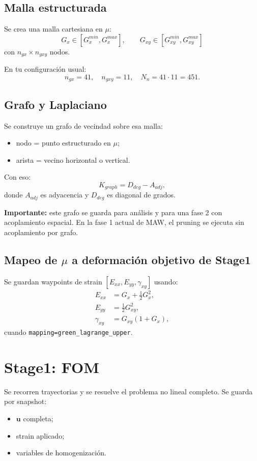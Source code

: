 \documentclass[11pt,a4paper]{article}
\begin{document}
\subsection{Malla estructurada}
Se crea una malla cartesiana en $\mu$:
\[
G_x \in [G_x^{min}, G_x^{max}],\qquad
G_{xy} \in [G_{xy}^{min}, G_{xy}^{max}]
\]
con $n_{gx}\times n_{gxy}$ nodos.

En tu configuración usual:
\[
n_{gx}=41,\quad n_{gxy}=11,\quad N_n=41\cdot 11=451.
\]

\subsection{Grafo y Laplaciano}
Se construye un grafo de vecindad sobre esa malla:
\begin{itemize}[leftmargin=1.5em]
\item nodo = punto estructurado en $\mu$;
\item arista = vecino horizontal o vertical.
\end{itemize}
Con eso:
\[
K_{graph} = D_{deg} - A_{adj},
\]
donde $A_{adj}$ es adyacencia y $D_{deg}$ es diagonal de grados.

\textbf{Importante:} este grafo se guarda para análisis y para una fase 2 con acoplamiento espacial.
En la fase 1 actual de MAW, el pruning se ejecuta sin acoplamiento por grafo.

\subsection{Mapeo de $\mu$ a deformación objetivo de Stage1}
Se guardan waypoints de strain $[E_{xx},E_{yy},\gamma_{xy}]$ usando:
\begin{align}
E_{xx} &= G_x + \tfrac12 G_x^2,\\
E_{yy} &= \tfrac12 G_{xy}^2,\\
\gamma_{xy} &= G_{xy}(1+G_x),
\end{align}
cuando \texttt{mapping=green\_lagrange\_upper}.

\section{Stage1: FOM}
Se recorren trayectorias y se resuelve el problema no lineal completo.
Se guarda por snapshot:
\begin{itemize}[leftmargin=1.5em]
\item $\mathbf{u}$ completa;
\item strain aplicado;
\item variables de homogenización.
\end{itemize}
\end{document}
